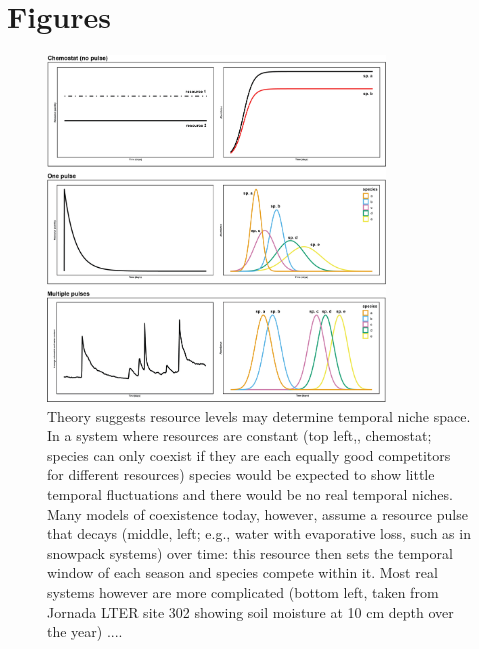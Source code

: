 \documentclass[11pt]{article}
\begin{document}
\newpage
\section{Figures}


\begin{figure}[h!]
\centering
\includegraphics[width=0.8\textwidth]{..//figures/JN_conceptfigs/sixpanel_concept.png}
\caption{Theory suggests resource levels may determine temporal niche space. In a system where resources are constant (top left,, chemostat; species can only coexist if they are each equally good competitors for different resources) species would be expected to show little temporal fluctuations and there would be no real temporal niches. Many models of coexistence today, however, assume a resource pulse that decays (middle, left; e.g., water with evaporative loss, such as in snowpack systems) over time: this resource then sets the temporal window of each season and species compete within it. Most real systems however are more complicated (bottom left, taken from Jornada LTER site 302 showing soil moisture at 10 cm depth over the year) ....} 
 \label{fig:resource}
\end{figure}
\end{document}
